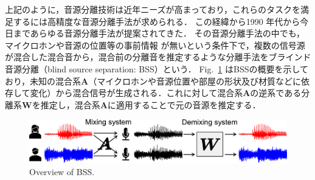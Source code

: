 上記のように，音源分離技術は近年ニーズが高まっており，これらのタスクを満足するには高精度な音源分離手法が求められる．
この経緯から1990 年代から今日まであらゆる音源分離手法が提案されてきた．
その音源分離手法の中でも，マイクロホンや音源の位置等の事前情報
が無いという条件下で，複数の信号源が混合した混合音から，混合前の分離音を推定するような分離手法をブラインド音源分離（blind source separation: BSS）\cite{BSS}という．
Fig.~\ref{fig:bss} はBSSの概要を示しており，未知の混合系$\bm{A}$（マイクロホンや音源位置や部屋の形状及び材質などに依存して変化）から混合信号が生成される．これに対して混合系$\bm{A}$の逆系である分離系$\bm{W}$を推定し，混合系$\bm{A}$に適用することで元の音源を推定する．
\begin{figure}[t]
    \vspace{4pt}
    \begin{center}
        \includegraphics[width=0.9\columnwidth]{figures/BSS.pdf}
    \end{center}
    \vspace{-8pt}
	\caption{Overview of BSS.}
	\label{fig:bss}
\end{figure}

